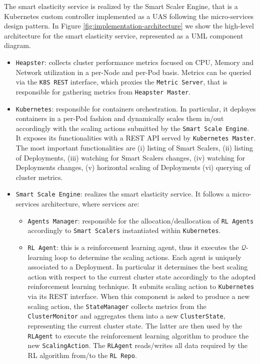 The smart elasticity service is realized by the Smart Scaler Engine, that is a Kubernetes custom controller implemented as a UAS following the micro-services design pattern.
%
In Figure \ref{fig:implementation-architecture} we show the high-level architecture for the smart elasticity service, represented as a UML component diagram.

\begin{itemize}
	
	\item \texttt{Heapster}: collects cluster performance metrics focused on CPU, Memory and Network utilization in a per-Node and per-Pod basis. 
	Metrics can be queried via the \texttt{K8S REST} interface, which proxies the \texttt{Metric Server}, that is responsible for gathering metrics from \texttt{Heapster Master}.
	
	\item \texttt{Kubernetes}: responsible for containers orchestration. 
	In particular, it deployes containers in a per-Pod fashion and dynamically scales them in/out accordingly with the scaling actions submitted by the \texttt{Smart Scale Engine}.
	It exposes its functionalities with a REST API served by \texttt{Kubernetes Master}.
	The most important functionalities are 
	(i) listing of Smart Scalers,
	(ii) listing of Deployments,
	(iii) watching for Smart Scalers changes,
	(iv) watching for Deployments changes,
	(v) horizontal scaling of Deployments
	(vi) querying of cluster metrics.
	
	\item \texttt{Smart Scale Engine}: realizes the smart elasticity service. It follows a micro-services architecture, where services are:
	
	\begin{itemize}
		
		\item \texttt{Agents Manager}: responsible for the allocation/deallocation of \texttt{RL Agents} accordingly to \texttt{Smart Scalers} instantiated within \texttt{Kubernetes}.
		
		\item \texttt{RL Agent}: this is a reinforcement learning agent, thus it executes the $\mathcal{Q}$-learning loop to determine the scaling actions. Each agent is uniquely associated to a Deployment. In particular it determines the best scaling action with respect to the current cluster state accordingly to the adopted reinforcement learning technique. It submits scaling action to \texttt{Kubernetes} via its REST interface. When this component is asked to produce a new scaling action, the \texttt{StateManager} collects metrics from the \texttt{ClusterMonitor} and aggregates them into a new \texttt{ClusterState}, representing the current cluster state. The latter are then used by the \texttt{RLAgent} to execute the reinforcement learning algorithm to produce the new \texttt{ScalingAction}. The \texttt{RLAgent} reads/writes all data required by the RL algorithm from/to the \texttt{RL Repo}.
		

\end{itemize}
\end{itemize}
